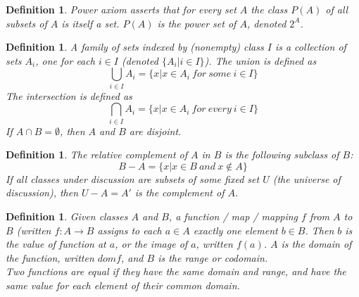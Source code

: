 \documentclass[a4paper,sfsidenotes,openany]{tufte-book}
\theoremstyle{theorem}
\newtheorem{definition}[theorem]{Definition}
\begin{document}
\begin{fullwidth}
\begin{definition}
\textit{{\color{blue} Power axiom}} asserts that for every set $ A $ the class $ P(A) $ of all subsets of $ A $ is itself a set. $ P(A) $ is the \textit{{\color{blue} power set}} of $ A $, denoted $ 2^A $.\\
\end{definition}
\>

\begin{definition}
A \textit{{\color{blue} family of sets}} indexed by (nonempty) class $ I $ is a collection of sets $ A_i $, one for each $ i \in I $ (denoted $\{ A_i | i \in I \}$).\newline
The \textit{{\color{blue} union}} is defined as 
\begin{equation}
\bigcup\limits_{i \in I}A_{i} = \{ x | x \in A_i \ for \ some \ i \in I \}
\end{equation}
The \textit{{\color{blue} intersection}} is defined as 
\begin{equation}
\bigcap\limits_{i \in I}A_{i} = \{ x | x \in A_i \ for \ every \ i \in I \}
\end{equation}
If $ A \cap B = \emptyset $, then $ A $ and $ B $ are disjoint.\\
\end{definition}
\>

\begin{definition}
The \textit{{\color{blue} relative complement}} of $ A $ in $ B $ is the following subclass of $ B $: \\
\begin{equation}
B-A = \{ x | x \in B \ and \ x \notin A \}
\end{equation}
If all classes under discussion are subsets of some fixed set $ U $ (the universe of discussion), then $ U - A = A' $ is the \textit{{\color{blue} complement}} of $ A $.\\
\end{definition}
\>

\begin{definition}
Given classes $ A $ and $ B $, a \textit{{\color{blue} function / map / mapping}} $ f $ from $ A $ to $ B $ (written $ f: A \rightarrow B $ assigns to each $ a \in A $ exactly one element $ b \in B $.\newline
Then $ b $ is the value of function at $ a $, or the \textit{{\color{blue} image}} of $ a $, written $ f(a) $.\newline
$ A $ is the \textit{{\color{blue} domain}} of the function, written $ dom f $, and $ B $ is the \textit{{\color{blue} range}} or \textit{{\color{blue} codomain}}.\\
Two functions are \textit{{\color{blue} equal}} if they have the same domain and range, and have the same value for each element of their common domain.\\
\end{definition}
\>


\end{fullwidth}
\end{document}
